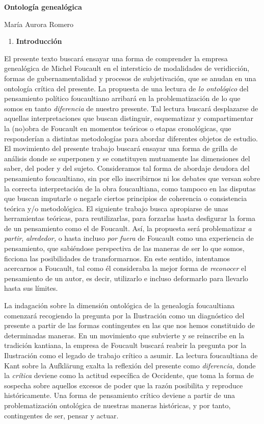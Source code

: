 \textbf{Ontología genealógica}

María Aurora Romero

\begin{enumerate}
\def\labelenumi{\arabic{enumi}.}
\item
  \textbf{Introducción}
\end{enumerate}

El presente texto buscará ensayar una forma de comprender la empresa genealógica de Michel Foucault en el intersticio de modalidades de veridicción, formas de gubernamentalidad y procesos de subjetivación, que se anudan en una ontología crítica del presente. La propuesta de una lectura de \emph{lo ontológico} del pensamiento político foucaultiano arribará en la problematización de lo que somos en tanto \emph{diferencia} de nuestro presente. Tal lectura buscará desplazarse de aquellas interpretaciones que buscan distinguir, esquematizar y compartimentar la (no)obra de Foucault en momentos teóricos o etapas cronológicas, que responderían a distintas metodologías para abordar diferentes objetos de estudio. El movimiento del presente trabajo buscará ensayar una forma de grilla de análisis donde se superponen y se constituyen mutuamente las dimensiones del saber, del poder y del sujeto. Consideramos tal forma de abordaje deudora del pensamiento foucaultiano, sin por ello inscribirnos ni los debates que versan sobre la correcta interpretación de la obra foucaultiana, como tampoco en las disputas que buscan imputarle o negarle ciertos principios de coherencia o consistencia teórica y/o metodológica. El siguiente trabajo busca apropiarse de unas herramientas teóricas, para reutilizarlas, para forzarlas hasta desfigurar la forma de un pensamiento como el de Foucault. Así, la propuesta será problematizar \emph{a partir}, \emph{alrededor,} o hasta incluso \emph{por fuera} de Foucault como una experiencia de pensamiento, que sabiéndose perspectiva de las maneras de ser lo que somos, ficciona las posibilidades de transformarnos. En este sentido, intentamos acercarnos a Foucault, tal como él consideraba la mejor forma de \emph{reconocer }el pensamiento de un autor, es decir, utilizarlo e incluso deformarlo para llevarlo hasta sus límites.

La indagación sobre la dimensión ontológica de la genealogía foucaultiana comenzará recogiendo la pregunta por la Ilustración como un diagnóstico del presente a partir de las formas contingentes en las que nos hemos constituido de determinadas maneras. En un movimiento que subvierte y se reinscribe en la tradición kantiana, la empresa de Foucault buscará reabrir la pregunta por la Ilustración como el legado de trabajo crítico a asumir. La lectura foucaultiana de Kant sobre la Aufklärung exalta la reflexión del presente como \emph{diferencia, }donde la\emph{ crítica} deviene como la actitud específica de Occidente, que toma la forma de sospecha sobre aquellos excesos de poder que la razón posibilita y reproduce históricamente. Una forma de pensamiento crítico deviene a partir de una problematización ontológica de nuestras maneras históricas, y por tanto, contingentes de ser, pensar y actuar.

